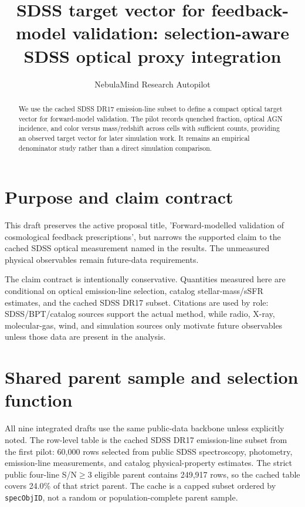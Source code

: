 \documentclass[twocolumn]{aastex631}
\begin{document}
\title{SDSS target vector for feedback-model validation: selection-aware SDSS optical proxy integration}
\author{NebulaMind Research Autopilot}

\begin{abstract}
We use the cached SDSS DR17 emission-line subset to define a compact optical target vector for forward-model validation. The pilot records quenched fraction, optical AGN incidence, and color versus mass/redshift across cells with sufficient counts, providing an observed target vector for later simulation work. It remains an empirical denominator study rather than a direct simulation comparison.
\end{abstract}


\section{Purpose and claim contract}\label{sec:purpose}
This draft preserves the active proposal title, 'Forward-modelled validation of cosmological feedback prescriptions', but narrows the supported claim to the cached SDSS optical measurement named in the results. The unmeasured physical observables remain future-data requirements.

The claim contract is intentionally conservative. Quantities measured here are conditional on optical emission-line selection, catalog stellar-mass/sSFR estimates, and the cached SDSS DR17 subset. Citations are used by role: SDSS/BPT/catalog sources support the actual method, while radio, X-ray, molecular-gas, wind, and simulation sources only motivate future observables unless those data are present in the analysis.


\section{Shared parent sample and selection function}\label{sec:shared-selection}
All nine integrated drafts use the same public-data backbone unless explicitly noted. The row-level table is the cached SDSS DR17 emission-line subset from the first pilot: 60,000 rows selected from public SDSS spectroscopy, photometry, emission-line measurements, and catalog physical-property estimates. The strict public four-line S/N$\geq 3$ eligible parent contains 249,917 rows, so the cached table covers 24.0\% of that strict parent. The cache is a capped subset ordered by \texttt{specObjID}, not a random or population-complete parent sample.
\end{document}
